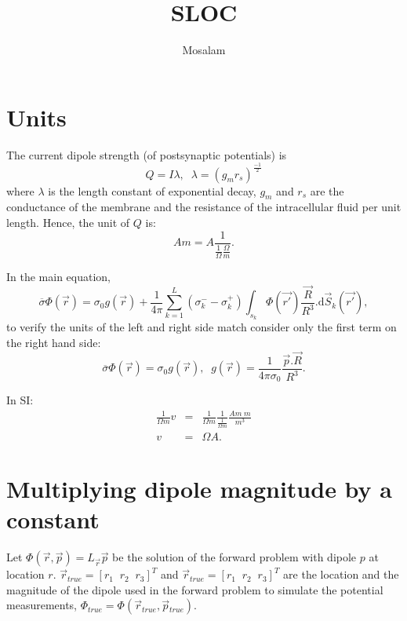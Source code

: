 \documentclass[10pt,letterpaper]{article}
\author{Mosalam}
\title{SLOC}
\begin{document}
\section{Units}

The current dipole strength (of postsynaptic potentials) is \cite{matti93} 
\begin{equation}
Q = I\lambda, \;\; \lambda = (g_m r_s)^{\frac{-1}{2}}
\end{equation}
where $\lambda$ is the length constant of exponential decay, $g_m$ and $r_s$ are the conductance of the membrane and the resistance of the intracellular fluid per unit length. Hence, the unit of $Q$ is: 
\begin{equation}
Am = A \frac{1}{\frac{1}{\Omega}\frac{\Omega}{m}}.
\end{equation}


In the main equation,
\begin{equation}\overline{\sigma} \Phi( \overrightarrow{r} ) =  \sigma_{0} g(\overrightarrow{r}) + \frac{1}{4\pi}\sum_{k=1}^{L}(\sigma_{k}^{-}-\sigma_{k}^{+})\int_{s_k} \! \Phi(\overrightarrow{r'}) \frac{\overrightarrow{R}}{R^3}.\mathrm{d}\overrightarrow{S}_k(\overrightarrow{r'}) ,
\end{equation}
to verify the units of the left and right side match consider only the first term on the right hand side:
\begin{equation}
\overline{\sigma} \Phi( \overrightarrow{r} ) =  \sigma_{0} g(\overrightarrow{r}),\;\; g(\overrightarrow{r}) = \frac{1}{4\pi\sigma_{0}} \frac{\overrightarrow{p}.\overrightarrow{R}}{R^{3}}.
\end{equation}

In SI:
\begin{eqnarray}
\frac{1}{\Omega m} v & = & \frac{1}{\Omega m}  \frac{1}{\frac{1}{\Omega m}} \frac{Am\; m}{m^{3}} \nonumber \\ 
v & = & \Omega A.
\end{eqnarray}


\section{Multiplying dipole magnitude by a constant}

Let $\Phi( \overrightarrow{r}, \overrightarrow{p} ) = L_{\overrightarrow{r}} \overrightarrow{p}$ be the solution of the forward problem with dipole $p$ at location $r$. $\overrightarrow{r}_{true} = [r_{1}\;\; r_{2}\;\; r_{3}]^T$ and $\overrightarrow{r}_{true} = [r_{1}\;\; r_{2}\;\; r_{3}]^T$ are the location and the magnitude of the dipole used in the forward problem to simulate the potential measurements, $\Phi_{true} = \Phi( \overrightarrow{r}\!_{true}, \overrightarrow{p}\!_{true} )$.
\end{document}
